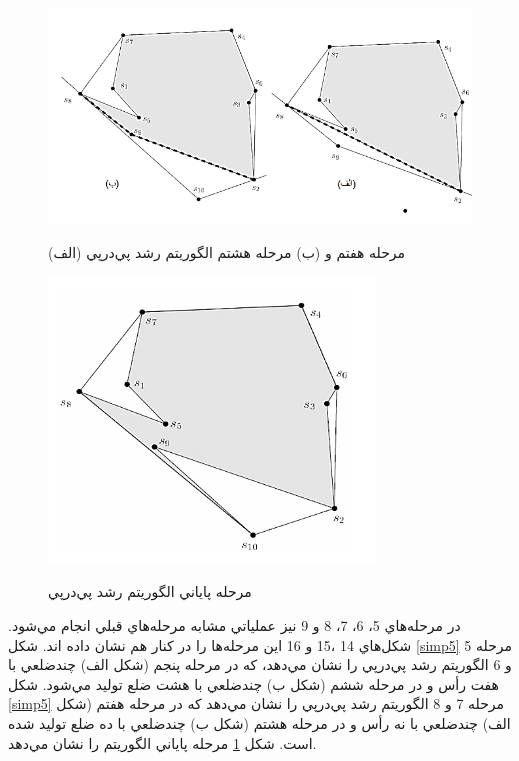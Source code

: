 \documentclass{book}
\begin{document}
\begin{figure}[h!]
    \begin{center}
        \includegraphics[width=\linewidth]{simp6.png}
        \label{simp6}
        \caption{(الف) مرحله هفتم و (ب) مرحله هشتم الگوريتم رشد پي‌درپي}
    \end{center}
\end{figure}

\begin{figure}[h!]
    \begin{center}
        \includegraphics[width=\linewidth]{simp7.png}
        \label{simp7}
        \caption{مرحله پاياني الگوريتم رشد پي‌درپي}
    \end{center}
\end{figure}

در مرحله‌هاي 5، 6، 7، 8 و 9 نيز عملياتي مشابه مرحله‌هاي قبلي انجام مي‌شود. شکل‌هاي‌ 14 ،15 و 16 اين مرحله‌ها را در کنار هم نشان داده اند. شکل‌ \ref{simp5} مرحله 5 و 6 الگوريتم رشد پي‌درپي را نشان مي‌دهد، که در مرحله پنجم (شکل الف) چندضلعي با هفت رأس و در مرحله ششم (شکل ب) چندضلعي با هشت ضلع توليد مي‌شود. شکل \ref{simp5} مرحله 7 و 8 الگوريتم رشد پي‌درپي را نشان مي‌دهد که در مرحله هفتم (شکل الف) چندضلعي با نه رأس و در مرحله هشتم (شکل ب) چندضلعي با ده ضلع توليد شده است. شکل \ref{simp6} مرحله پاياني الگوريتم را نشان مي‌دهد.
\end{document}
